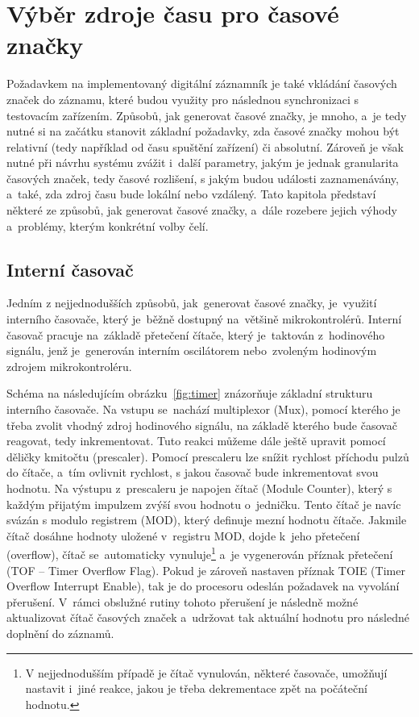 \section{Výběr zdroje času pro časové značky}
\label{zdroje_casu}
Požadavkem na implementovaný digitální záznamník je také vkládání časových značek do záznamu, které budou využity pro následnou synchronizaci s testovacím zařízením. Způsobů, jak generovat časové značky, je mnoho, a~je tedy nutné si na začátku stanovit základní požadavky, zda časové značky mohou být relativní (tedy například od času spuštění zařízení) či absolutní. Zároveň je však nutné při návrhu systému zvážit i~další parametry, jakým je jednak granularita časových značek, tedy časové rozlišení, s jakým budou události zaznamenávány, a~také, zda zdroj času bude lokální nebo vzdálený. Tato kapitola představí některé ze způsobů, jak generovat časové značky, a~dále rozebere jejich výhody a~problémy, kterým konkrétní volby čelí.~\cite{perny2008zarizeni_cas_znacky}

\subsection{Interní časovač}
Jedním z nejjednodušších způsobů, jak~generovat časové značky, je~využití interního časovače, který je~běžně dostupný na~většině mikrokontrolérů. Interní časovač pracuje na~základě přetečení čítače, který je~taktován z~hodinového signálu, jenž je~generován interním oscilátorem nebo~zvoleným hodinovým zdrojem mikrokontroléru.~\cite{nxp_KL05_Reference_Manual}

Schéma na následujícím obrázku~\ref{fig:timer} znázorňuje základní strukturu interního časovače. Na vstupu se~nachází multiplexor (Mux), pomocí kterého je třeba zvolit vhodný zdroj hodinového signálu, na základě kterého bude časovač reagovat, tedy inkrementovat. Tuto reakci můžeme dále ještě upravit pomocí děličky kmitočtu (prescaler). Pomocí prescaleru lze snížit rychlost příchodu pulzů do čítače, a~tím ovlivnit rychlost, s jakou časovač bude inkrementovat svou hodnotu. Na výstupu z~prescaleru je napojen čítač (Module Counter), který s každým přijatým impulzem zvýší svou hodnotu o~jedničku. Tento čítač je navíc svázán s modulo registrem (MOD), který definuje mezní hodnotu čítače. Jakmile čítač dosáhne hodnoty uložené v~registru MOD, dojde k~jeho přetečení (overflow), čítač se~automaticky vynuluje\footnote{V nejjednodušším případě je čítač vynulován, některé časovače, umožňují nastavit i~jiné reakce, jakou je třeba dekrementace zpět na počáteční hodnotu.} a~je vygenerován příznak přetečení (TOF -- Timer Overflow Flag). Pokud je zároveň nastaven příznak TOIE (Timer Overflow Interrupt Enable), tak je do procesoru odeslán požadavek na vyvolání přerušení. V~rámci obslužné rutiny tohoto přerušení je následně možné aktualizovat čítač časových značek a~udržovat tak aktuální hodnotu pro následné doplnění do záznamů.~\cite{nxp_KL05_Reference_Manual}

